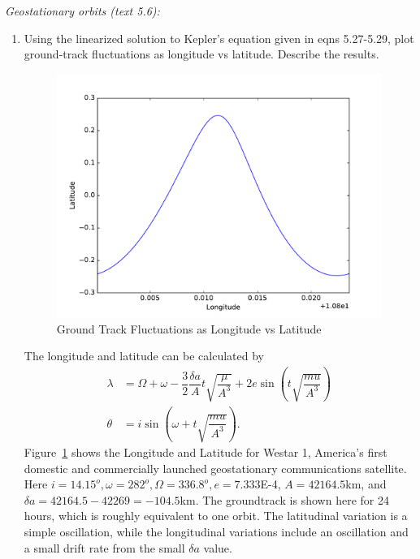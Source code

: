 \documentclass[onecolumn,10pt]{jhwhw}
\begin{document}
\problem{}
\textit{Geostationary orbits (text 5.6):}
\begin{enumerate}
\itemsep0em
\item Using the linearized solution to Kepler’s equation given in eqns 5.27-5.29, plot ground-track fluctuations as longitude vs latitude. Describe the results.
\begin{figure}[tbh!]
\begin{center}
\includegraphics[height=0.45\textheight]{p4a-1.pdf}
\end{center}
\caption{Ground Track Fluctuations as Longitude vs Latitude}
\label{fig:gtf}
\end{figure}

The longitude and latitude can be calculated by
\begin{align*}
\lambda &= \Omega + \omega - \dfrac{3}{2} \dfrac{\delta a}{A} t \sqrt{\dfrac{\mu}{A^3}} + 2e\sin{\left(t \sqrt{\dfrac{mu}{A^3}} \right)} \\
\theta &= i \sin{\left( \omega + t \sqrt{\dfrac{mu}{A^3}} \right)}.
\end{align*}
Figure~\ref{fig:gtf} shows the Longitude and Latitude for Westar 1, America's first domestic and commercially launched geostationary communications satellite. Here $i = 14.15^o, \omega = 282^o, \Omega = 336.8^o, e=7.333$E-4, $A=42164.5$km, and $\delta a=42164.5 - 42269=-104.5$km. The groundtrack is shown here for 24 hours, which is roughly equivalent to one orbit. The latitudinal variation is a simple oscillation, while the longitudinal variations include an oscillation and a small drift rate from the small $\delta a$ value.



\end{enumerate}
\end{document}
